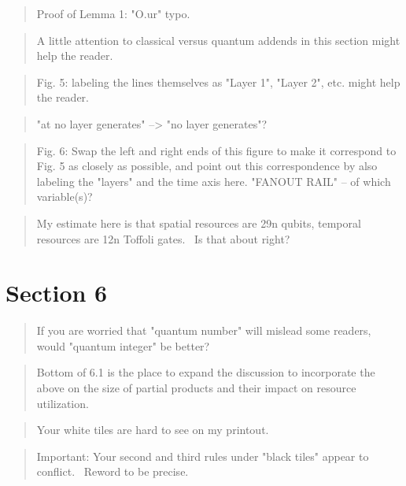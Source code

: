 \documentclass{article}
\theoremstyle{plain} \newtheorem{lemma}{Lemma}
\begin{document}
\begin{quote}
Proof of Lemma 1: "O.ur" typo. 
\end{quote}

\begin{quote}
A little attention to classical versus quantum addends in this section 
might help the reader. 
\end{quote}

\begin{quote}
Fig. 5: labeling the lines themselves as "Layer 1", "Layer 2", 
etc. might help the reader. 
\end{quote}

\begin{quote}
"at no layer generates" --> "no layer generates"? 
\end{quote}

\begin{quote}
Fig. 6: Swap the left and right ends of this figure to make it 
correspond to Fig. 5 as closely as possible, and point out this 
correspondence by also labeling the "layers" and the time axis here. 
"FANOUT RAIL" -- of which variable(s)? 
\end{quote}

\begin{quote}
My estimate here is that spatial resources are 29n qubits, temporal 
resources are 12n Toffoli gates.  Is that about right? 
\end{quote}

\section{Section 6}

\begin{quote}
If you are worried that "quantum number" will mislead some readers, 
would "quantum integer" be better? 
\end{quote}

\begin{quote}
Bottom of 6.1 is the place to expand the discussion to incorporate the 
above on the size of partial products and their impact on resource 
utilization. 
\end{quote}

\begin{quote}
Your white tiles are hard to see on my printout. 
\end{quote}

\begin{quote}
Important: Your second and third rules under "black tiles" appear to 
conflict.  Reword to be precise. 
\end{quote}
\end{document}

